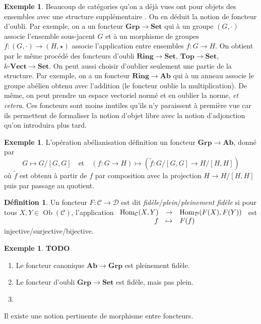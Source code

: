 \documentclass{article}
\newcommand{\cat}{\mathcal{C}}
\newcommand{\catt}{\mathcal{D}}
\newcommand{\Set}{\mathbf{Set}}
\newcommand{\Top}{\mathbf{Top}}
\newcommand{\Grp}{\mathbf{Grp}}
\newcommand{\Ab}{\mathbf{Ab}}
\newcommand{\Vectcat}{\mathbf{Vect}}
\newcommand{\Ring}{\mathbf{Ring}}
\DeclareMathOperator{\Ob}{Ob}
\DeclareMathOperator{\Hom}{Hom}
\newcommand{\todo}{\textbf{TODO}}
\newcommand{\applic}[4]{\begin{array}[t]{rcl}
#1 & \to & #2 \\
#3 & \mapsto & #4
\end{array}}
\theoremstyle{plain}
\theoremstyle{definition}
\newtheorem{definition}[theorem]{Définition}
\newtheorem{example}[theorem]{Exemple}
\theoremstyle{remark}
\begin{document}
\begin{example} Beaucoup de catégories qu'on a déjà vues ont pour objets des \og ensembles avec une structure supplémentaire \fg. On en déduit la notion de foncteur d'oubli. Par exemple, on a un foncteur $\Grp \to \Set$ qui à un groupe $(G,\cdot)$ associe l'ensemble sous-jacent $G$ et à un morphisme de groupes $f : (G,\cdot) \to (H,\star)$ associe l'application entre ensembles $f : G\to H$. On obtient par le même procédé des foncteurs d'oubli $\Ring \to \Set$, $\Top \to \Set$, $k\text{-}\Vectcat \to \Set$. On peut aussi choisir d'oublier seulement une partie de la structure. Par exemple, on a un foncteur $\Ring \to \Ab$ qui à un anneau associe le groupe abélien obtenu avec l'addition (le foncteur oublie la multiplication). De même, on peut prendre un espace vectoriel normé et en oublier la norme, \emph{et cetera}. Ces foncteurs sont moins inutiles qu'ils n'y paraissent à première vue car ils permettent de formaliser la notion d'\og objet libre \fg avec la notion d'adjonction qu'on introduira plus tard.
\end{example}

\begin{example}
    L'opération abélianisation définition un foncteur $\Grp \to \Ab$, donné par
    \[G \mapsto G/[G,G] \quad \text{et} \quad (f : G \to H) \mapsto (\tilde{f} : G/[G,G] \to H/[H,H])\]
    où $\tilde{f}$ est obtenu à partir de $f$ par composition avec la projection $H \to H/[H,H]$ puis par passage au quotient. 
\end{example}

\begin{definition}
    Un foncteur $F : \cat \to \catt$ est dit \emph{fidèle}/\emph{plein}/\emph{pleinement fidèle} si pour tous $X,Y \in \Ob(\cat)$, l'application $\applic{\Hom_\cat (X,Y)}{\Hom_\catt(F(X),F(Y))}{f}{F(f)}$ est injective/surjective/bijective.
\end{definition}

\begin{example} \todo
    \begin{enumerate}
        \item Le foncteur canonique $\Ab \to \Grp$ est pleinement fidèle.
        \item Le foncteur d'oubli $\Grp \to \Set$ est fidèle, mais pas plein.
        \item 
    \end{enumerate}
\end{example}

Il existe une notion pertinente de morphisme entre foncteurs.
\end{document}

